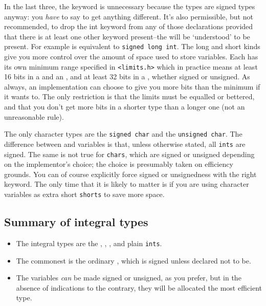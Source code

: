    In the last three, the \signed{} keyword is unnecessary
    because the \kint{} types are signed types anyway: you
    \textit{have} to say \unsigned{} to get anything different. It's
    also permissible, but not recommended, to drop the int keyword from any of
    those declarations provided that there is at least one other keyword
    present--the \kint{} will be `understood' to be
    present. For example \klong{} is equivalent to \texttt{signed long
    int}. The long and short kinds give you more control over the amount
    of space used to store variables. Each has its own minimum range specified
    in \texttt{<limits.h>} which in practice means at least
    16 bits in a \short{} and an \kint, and at least
    32 bits in a \klong, whether signed or unsigned. As
    always, an implementation can choose to give you more bits than the
    minimum if it wants to. The only restriction is that the limits must be
    equalled or bettered, and that you don't get more bits in a shorter type
    than a longer one (not an unreasonable rule).


   The only character types are the \texttt{signed char} and the
    \texttt{unsigned char}. The difference between \kchar{} and
    \kint{} variables is that, unless otherwise stated, all
    \texttt{ints} are signed. The same is not true for \texttt{chars},
    which are signed or unsigned depending on the implementor's choice; the
    choice is presumably taken on efficiency grounds. You can of course
    explicitly force signed or unsignedness with the right keyword. The only
    time that it is likely to matter is if you are using character variables
    as extra short \texttt{shorts} to save more space.


  

  \subsection{Summary of integral types}

   \begin{itemize}
    \item The integral types are the \short, \klong,
     \signed, \unsigned{} and plain
     \texttt{ints}.
    \item The commonest is the ordinary \kint, which is signed unless
     declared not to be.
    \item The \kchar{} variables \textit{can} be made signed or
     unsigned, as you prefer, but in the absence of indications to the
     contrary, they will be allocated the most efficient type.
   \end{itemize}

